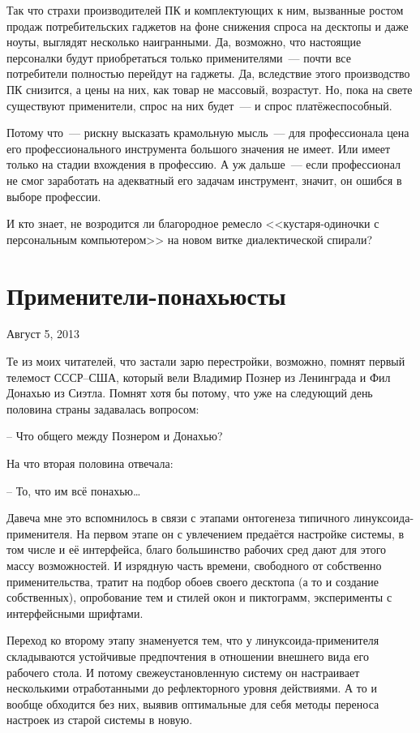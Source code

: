 Так что страхи производителей ПК и комплектующих к ним, вызванные ростом продаж потребительских гаджетов на фоне снижения спроса на десктопы и даже ноуты, выглядят несколько наигранными. Да, возможно, что настоящие персоналки будут приобретаться только применителями~--- почти все потребители полностью перейдут на гаджеты. Да, вследствие этого производство ПК снизится, а цены на них, как товар не массовый, возрастут. Но, пока на свете существуют применители, спрос на них будет~--- и спрос платёжеспособный.

Потому что~--- рискну высказать крамольную мысль~--- для профессионала цена его профессионального инструмента большого значения не имеет. Или имеет только на стадии вхождения в профессию. А уж дальше~--- если профессионал не смог заработать на адекватный его задачам инструмент, значит, он ошибся в выборе профессии.

И кто знает, не возродится ли благородное ремесло <<кустаря-одиночки с персональным компьютером>> на новом витке диалектической спирали?

\section{Применители-понахьюсты} 

\begin{timeline}Август 5, 2013\end{timeline}

Те из моих читателей, что застали зарю перестройки, возможно, помнят первый телемост СССР--США, который вели Владимир Познер из Ленинграда и Фил Донахью из Сиэтла. Помнят хотя бы потому, что уже на следующий день половина страны задавалась вопросом:

-- Что общего между Познером и Донахью?

На что вторая половина отвечала:

-- То, что им всё понахью\dots

Давеча мне это вспомнилось в связи с этапами онтогенеза типичного линуксоида-применителя. На первом этапе он с увлечением предаётся настройке системы, в том числе и её интерфейса, благо большинство рабочих сред дают для этого массу возможностей. И изрядную часть времени, свободного от собственно применительства, тратит на подбор обоев своего десктопа (а то и создание собственных), опробование тем и стилей окон и пиктограмм, эксперименты с интерфейсными шрифтами.

Переход ко второму этапу знаменуется тем, что у линуксоида-применителя складываются  устойчивые предпочтения в отношении внешнего вида его рабочего стола. И потому свежеустановленную систему он настраивает несколькими отработанными до рефлекторного уровня действиями. А то и вообще обходится без них, выявив оптимальные для себя методы переноса настроек из старой системы в новую.

